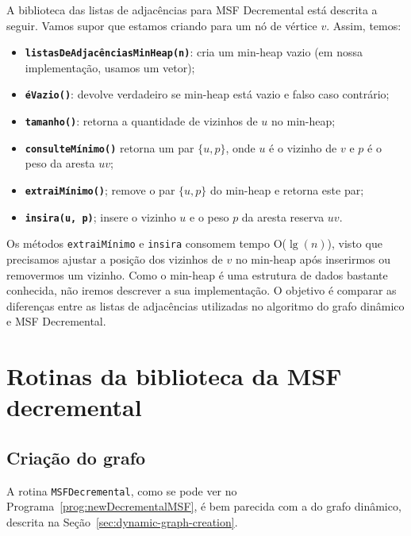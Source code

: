 A biblioteca das listas de adjacências para MSF Decremental está descrita a seguir. Vamos supor que estamos criando para um nó de vértice $v$. Assim, temos:

\begin{itemize}
    \item \texttt{\textbf{listasDeAdjacênciasMinHeap(n)}}: cria um min-heap vazio (em nossa implementação, usamos um vetor);
    \item \texttt{\textbf{éVazio()}}: devolve verdadeiro se min-heap está vazio e falso caso contrário;
    \item \texttt{\textbf{tamanho()}}: retorna a quantidade de vizinhos de $u$ no min-heap;
    \item \texttt{\textbf{consulteMínimo()}} retorna um par $\{u, p\}$, onde $u$ é o vizinho de $v$ e $p$ é o peso da aresta $uv$;
    \item \texttt{\textbf{extraiMínimo()}}; remove o par $\{u, p\}$ do min-heap e retorna este par;
    \item \texttt{\textbf{insira(u, p)}}; insere o vizinho $u$ e o peso $p$ da aresta reserva $uv$.

\end{itemize} 

Os métodos \texttt{extraiMínimo} e \texttt{insira} consomem tempo O($\lg(n)$), visto que precisamos ajustar a posição dos vizinhos de $v$ no min-heap após inserirmos ou removermos um vizinho. Como o min-heap é uma estrutura de dados bastante conhecida, não iremos descrever a sua implementação. O objetivo é comparar as diferenças entre as listas de adjacências utilizadas no algoritmo do grafo dinâmico e MSF Decremental.

\section{Rotinas da biblioteca da MSF decremental}

\subsection{Criação do grafo}

A rotina \texttt{MSFDecremental}, como se pode ver no Programa~\ref{prog:newDecrementalMSF}, é bem parecida com a do grafo dinâmico, descrita na Seção~\ref{sec:dynamic-graph-creation}. 

